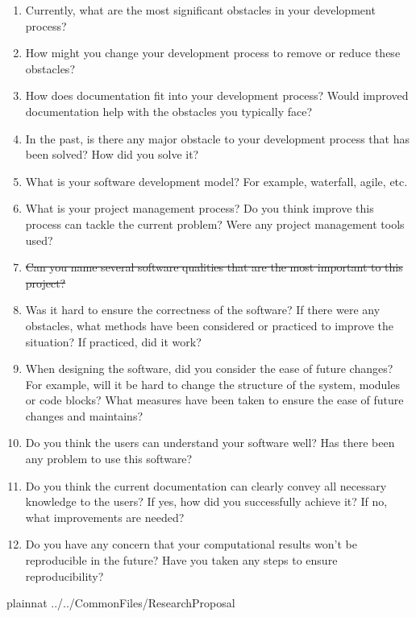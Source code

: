 \documentclass[12pt]{article}
\begin{document}
\begin{enumerate}
\item Currently, what are the most significant obstacles in your development
process?
\item How might you change your development process to remove or reduce these
obstacles?
\item How does documentation fit into your development process? Would improved
documentation help with the obstacles you typically face?
\item In the past, is there any major obstacle to your development process that
has been solved? How did you solve it?
\item What is your software development model? For example, waterfall, agile, etc.
\item What is your project management process? Do you think improve this process
can tackle the current problem? Were any project management tools used?
\item \sout{Can you name several software qualities that are the most important to
this project?}
\item Was it hard to ensure the correctness of the software? If there were any
 obstacles, what methods have been considered or practiced to improve the situation?
  If practiced, did it work?
\item When designing the software, did you consider the ease of future changes?
 For example, will it be hard to change the structure of the system, modules or code
  blocks? What measures have been taken to ensure the ease of future changes
   and maintains?
\item Do you think the users can understand your software well? Has there been
any problem to use this software?
\item Do you think the current documentation can clearly convey all necessary
knowledge to the users? If yes, how did you successfully achieve it? If no, what
improvements are needed?
\item Do you have any concern that your computational results won't be
reproducible in the future? Have you taken any steps to ensure reproducibility?
\end{enumerate}

\newpage

 {plainnat}
 {../../CommonFiles/ResearchProposal}
\end{document}
